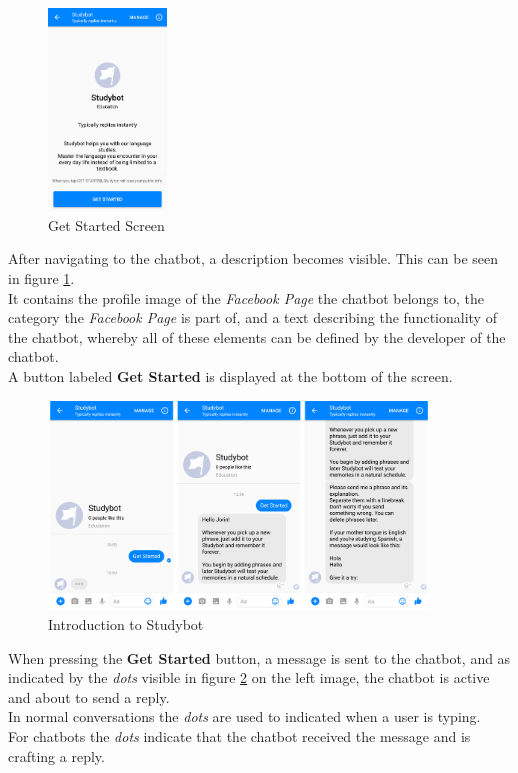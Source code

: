 \begin{figure}
  \centering
  \includegraphics[width=0.28\textwidth]{images/interface/02-getstarted.png}
	\caption{Get Started Screen}
	\label{fig:02-getstarted}
\end{figure}

After navigating to the chatbot,
a description becomes visible.
This can be seen in figure \ref{fig:02-getstarted}.
\\
It contains the profile image of the \emph{Facebook Page} the chatbot belongs to,
the category the \emph{Facebook Page} is part of,
and a text describing the functionality of the chatbot,
whereby all of these elements can be defined by the developer of the chatbot.
\\
A button labeled \textbf{Get Started} is displayed at the bottom of the screen.
\\

\begin{figure}[h]
  \centering
  \includegraphics[width=0.9\textwidth]{images/interface/03-welcome.png}
	\caption{Introduction to Studybot}
	\label{fig:03-welcome}
\end{figure}

When pressing the \textbf{Get Started} button, a message is sent to the chatbot,
and as indicated by the \emph{dots} visible in figure \ref{fig:03-welcome} on the left image,
the chatbot is active and about to send a reply.
\\
In normal conversations the \emph{dots} are used to indicated when a user is typing.
\\
For chatbots the \emph{dots} indicate that the chatbot received the message and is crafting a reply.
\\


